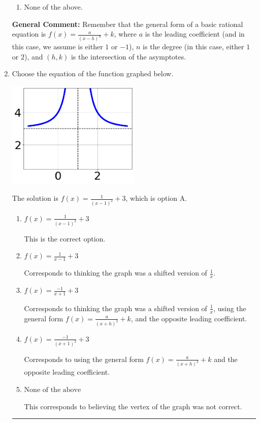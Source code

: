 \documentclass{extbook}[14pt]
\newcommand{\litem}[1]{\item #1

\rule{\textwidth}{0.4pt}}
\begin{document}
\begin{enumerate}
{\begin{enumerate}[label=\Alph*.]
\begin{multicols}{2}
\end{multicols}\item None of the above.\end{enumerate}
\textbf{General Comment:} Remember that the general form of a basic rational equation is $ f(x) = \frac{a}{(x-h)^n} + k$, where $a$ is the leading coefficient (and in this case, we assume is either $1$ or $-1$), $n$ is the degree (in this case, either $1$ or $2$), and $(h, k)$ is the intersection of the asymptotes.
}
\litem{
Choose the equation of the function graphed below.

\begin{center}
    \includegraphics[width=0.5\textwidth]{../Figures/rationalGraphToEquationCopyB.png}
\end{center}


The solution is \( f(x) = \frac{1}{(x - 1)^2} + 3 \), which is option A.\begin{enumerate}[label=\Alph*.]
\item \( f(x) = \frac{1}{(x - 1)^2} + 3 \)

This is the correct option.
\item \( f(x) = \frac{1}{x - 1} + 3 \)

Corresponds to thinking the graph was a shifted version of $\frac{1}{x}$.
\item \( f(x) = \frac{-1}{x + 1} + 3 \)

Corresponds to thinking the graph was a shifted version of $\frac{1}{x}$, using the general form $f(x) = \frac{a}{(x+h)^2}+k$, and the opposite leading coefficient.
\item \( f(x) = \frac{-1}{(x + 1)^2} + 3 \)

Corresponds to using the general form $f(x) = \frac{a}{(x+h)^2}+k$ and the opposite leading coefficient.
\item \( \text{None of the above} \)

This corresponds to believing the vertex of the graph was not correct.
\end{enumerate}

}
\end{enumerate}
\end{document}
